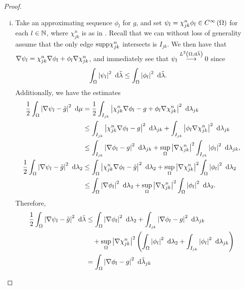 \begin{proof}
	\begin{enumerate}[(i)]
		\item Take an approximating sequence $\phi_l$ for $g$, and set $\psi_l = \chi_{jk}^n\phi_l\in C^{\infty}\left( \Omega \right)$ for each $l\in\mathbb{N}$, where $\chi_{jk}^n$ is as in .
		Recall that we can without loss of generality assume that the only edge $\mathrm{supp}\chi_{jk}^n$ intersects is $I_{jk}$.
		We then have that $\nabla\psi_l = \chi_{jk}^n\nabla\phi_l + \phi_l\nabla\chi_{jk}^n$, and immediately see that $\psi_l\overset{L^{2}\left( \Omega,\mathrm{d}\tilde{\lambda} \right)}{\longrightarrow}0$ since
		\begin{align*}
			\int_{\Omega}\left\lvert  \psi_l  \right\rvert^2 \ \mathrm{d}\tilde{\lambda}
			&\leq \int_{\Omega}\left\lvert  \phi_l  \right\rvert^2 \ \mathrm{d}\tilde{\lambda}.
		\end{align*}
		Additionally, we have the estimates
		\begin{align*}
			\frac{1}{2}\int_{\Omega}\left\lvert  \nabla\psi_l - \tilde{g}  \right\rvert^2 \ \mathrm{d}\mu
			&= \frac{1}{2}\int_{I_{jk}}\left\lvert  \chi_{jk}^n\nabla\phi_l - g  + \phi_l\nabla\chi_{jk}^n  \right\rvert^2 \ \mathrm{d}\lambda_{jk} \\
			&\leq \int_{I_{jk}}\left\lvert  \chi_{jk}^n\nabla\phi_l - g  \right\rvert^2 \ \mathrm{d}\lambda_{jk}
			+ \int_{I_{jk}}\left\lvert  \phi_l\nabla\chi_{jk}^n  \right\rvert^2 \ \mathrm{d}\lambda_{jk} \\
			&\leq \int_{I_{jk}}\left\lvert  \nabla\phi_l - g  \right\rvert^2 \ \mathrm{d}\lambda_{jk}
			+ \sup_{\Omega}\left\lvert \nabla\chi_{jk}^n \right\rvert^2 \int_{I_{jk}}\left\lvert  \phi_l  \right\rvert^2 \ \mathrm{d}\lambda_{jk}, \\
			\frac{1}{2}\int_{\Omega}\left\lvert  \nabla\psi_l - \tilde{g}  \right\rvert^2 \ \mathrm{d}\lambda_2
			&\leq \int_{\Omega}\left\lvert  \chi_{jk}^n\nabla\phi_l - \tilde{g}  \right\rvert^2 \ \mathrm{d}\lambda_2
			+ \sup_{\Omega}\left\lvert \nabla\chi_{jk}^n \right\rvert^2 \int_{\Omega}\left\lvert  \phi_l  \right\rvert^2 \ \mathrm{d}\lambda_2 \\
			&\leq \int_{\Omega}\left\lvert  \nabla\phi_l  \right\rvert^2 \ \mathrm{d}\lambda_2
			+ \sup_{\Omega}\left\lvert \nabla\chi_{jk}^n \right\rvert^2 \int_{\Omega}\left\lvert  \phi_l  \right\rvert^2 \ \mathrm{d}\lambda_2.
		\end{align*}
		Therefore,
		\begin{align*}
			\recip{2}\integral{\ddom}{\abs{ \grad\psi_l - \tilde{g} }^2}{\compMes}
			&\leq \integral{\ddom}{\abs{ \grad\phi_l }^2}{\lambda_2}
			+ \integral{I_{jk}}{\abs{ \grad\phi_l - g }^2}{\lambda_{jk}} \\
			&\quad + \sup_{\ddom}\abs{\grad\chi_{jk}^n}^2 
			\bracs{ \integral{\ddom}{\abs{ \phi_l }^2}{\lambda_2} 	+ \integral{I_{jk}}{\abs{ \phi_l }^2}{\lambda_{jk}} } \\
			&= \integral{\ddom}{\abs{ \grad\phi_l - g }^2}{\compMes_{jk}}

\end{align*}
\end{enumerate}
\end{proof}
